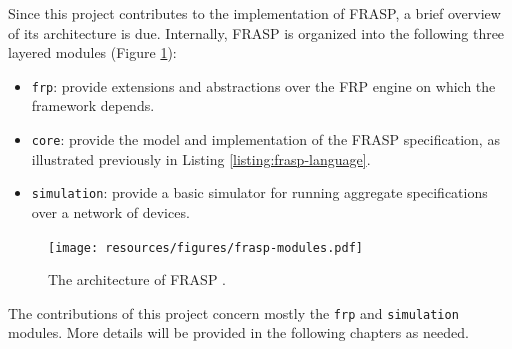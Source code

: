 Since this project contributes to the implementation of FRASP, a brief overview
of its architecture is due. Internally, FRASP is organized into the following
three layered modules (Figure \ref{figure:frasp-modules}):
\begin{itemize}
  \item \texttt{frp}: provide extensions and abstractions over the \ac{FRP}
        engine on which the framework depends.
  \item \texttt{core}: provide the model and implementation of the FRASP
        specification, as illustrated previously in Listing
        \ref{listing:frasp-language}.
  \item \texttt{simulation}: provide a basic simulator for running aggregate
        specifications over a network of devices.
\end{itemize}
\begin{figure}[h]
  \centering
  \texttt{[image: resources/figures/frasp-modules.pdf]}
  \caption{The architecture of FRASP \cite{FRASP}.}
  \label{figure:frasp-modules}
\end{figure}

The contributions of this project concern mostly the \texttt{frp} and
\texttt{simulation} modules. More details will be provided in the following
chapters as needed.
